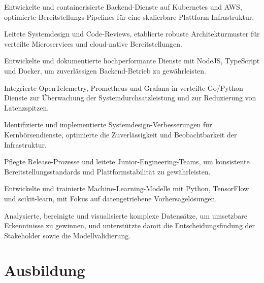 \documentclass[10pt,a4paper]{resume}
\begin{document}
\bullets
  \item Entwickelte und containerisierte Backend-Dienste auf Kubernetes und AWS, optimierte Bereitstellungs-Pipelines für eine skalierbare Plattform-Infrastruktur.
  \item Leitete Systemdesign und Code-Reviews, etablierte robuste Architekturmuster für verteilte Microservices und cloud-native Bereitstellungen.
  \item Entwickelte und dokumentierte hochperformante Dienste mit NodeJS, TypeScript und Docker, um zuverlässigen Backend-Betrieb zu gewährleisten.
\bulletsend
\vspace{1.5pt}
\bullets
  \item Integrierte OpenTelemetry, Prometheus und Grafana in verteilte Go/Python-Dienste zur Überwachung der Systemdurchsatzleistung und zur Reduzierung von Latenzspitzen.
  \item Identifizierte und implementierte Systemdesign-Verbesserungen für Kernbörsendienste, optimierte die Zuverlässigkeit und Beobachtbarkeit der Infrastruktur.
  \item Pflegte Release-Prozesse und leitete Junior-Engineering-Teams, um konsistente Bereitstellungsstandards und Plattformstabilität zu gewährleisten.
\bulletsend
\vspace{1.5pt}
\bullets
  \item Entwickelte und trainierte Machine-Learning-Modelle mit Python, TensorFlow und scikit-learn, mit Fokus auf datengetriebene Vorhersagelösungen.
  \item Analysierte, bereinigte und visualisierte komplexe Datensätze, um umsetzbare Erkenntnisse zu gewinnen, und unterstützte damit die Entscheidungsfindung der Stakeholder sowie die Modellvalidierung.
\bulletsend
\vspace{1.5pt}

\section{Ausbildung}

\vspace{2pt}
\end{document}
